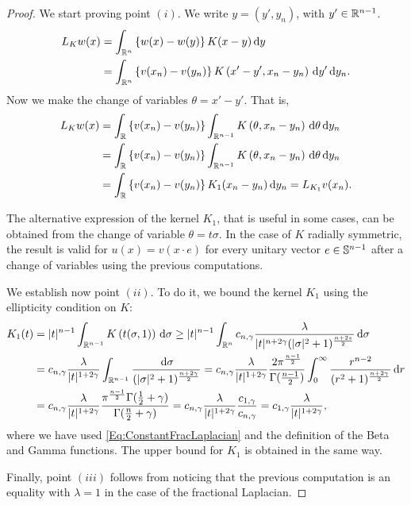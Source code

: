 \begin{proof}
	We start proving point $(i)$. We write $y=(y',y_n)$, with $y'\in \mathbb{R}^{n-1}$.
	\begin{align*}
	L_K w(x) &= \int_{\mathbb{R}^n} \left\{ w(x)-w(y) \right\} K(x-y) \,\mathrm{d} y \\
	&=\int_{\mathbb{R}^n} \left\{ v(x_n)-v(y_n) \right\} K\left(x'-y',x_n-y_n\right) \,\mathrm{d} y' \,\mathrm{d} y_n.
	\end{align*}
	Now we make the change of variables $\theta = x'-y'$. That is,
	\begin{align*}
	L_K w(x) &= \int_{\mathbb{R}} \left\{ v(x_n)-v(y_n) \right\} \int_{\mathbb{R}^{n-1}} K\left(\theta,x_n-y_n\right) \,\mathrm{d} \theta \,\mathrm{d} y_n \\
	&= \int_{\mathbb{R}} \left\{ v(x_n)-v(y_n) \right\} \int_{\mathbb{R}^{n-1}} K\left(\theta,x_n-y_n\right) \,\mathrm{d}\theta \,\mathrm{d} y_n \\
	&= \int_{\mathbb{R}} \left\{ v(x_n)-v(y_n) \right\} K_1(x_n-y_n ) \,\mathrm{d} y_n = L_{K_1}v(x_n).
	\end{align*}
	
	The alternative expression of the kernel $K_1$, that is useful in some cases, can be obtained from the change of variable $\theta = t\sigma$.	In the case of $K$ radially symmetric, the result is valid for $u(x) = v(x\cdot e)$ for every unitary vector $e\in \mathbb{S}^{n-1}$ after a change of variables using the previous computations.
	
	We establish now point $(ii)$. To do it, we bound the kernel $K_1$ using the ellipticity condition on $K$:
	\begin{align*}
	K_1(t) &= |t|^{n-1} \int_{\mathbb{R}^{n-1}} K\left(t(\sigma,1)\right) \,\mathrm{d}\sigma \geq |t|^{n-1} \int_{\mathbb{R}^n} c_{n,\gamma} \frac{\lambda}{|t|^{n+2\gamma}(|\sigma|^2+1)^{\frac{n+2s}{2}}} \,\mathrm{d}\sigma \\
	&= c_{n,\gamma} \frac{\lambda}{|t|^{1+2\gamma}} \int_{\mathbb{R}^{n-1}} \frac{\,\mathrm{d}\sigma}{(|\sigma|^2+1)^{\frac{n+2\gamma}{2}}} = c_{n,\gamma} \frac{\lambda}{|t|^{1+2\gamma}} \dfrac{2 \pi^{\frac{n-1}{2}}}{\Gamma(\frac{n-1}{2})} \int_0^\infty \dfrac{r^{n-2}}{(r^2+1)^{\frac{n+2\gamma}{2}}} \,\mathrm{d} r \\	
	& = c_{n,\gamma} \frac{\lambda}{|t|^{1+2\gamma}} 
	\dfrac{\pi^{\frac{n-1}{2}} \Gamma(\frac{1}{2}+\gamma)}{\Gamma(\frac{n}{2}+\gamma)} 
	= c_{n,\gamma} \frac{\lambda}{|t|^{1+2\gamma}} \frac{c_{1,\gamma}}{c_{n,\gamma}} = c_{1,\gamma} \frac{\lambda}{|t|^{1+2\gamma}},
	\end{align*}
	where we have used \eqref{Eq:ConstantFracLaplacian} and the definition of the Beta and Gamma functions. The upper bound for $K_1$ is obtained in the same way.
	
	Finally, point $(iii)$ follows from noticing that the previous computation is an equality with $\lambda = 1$ in the case of the fractional Laplacian.
\end{proof}





